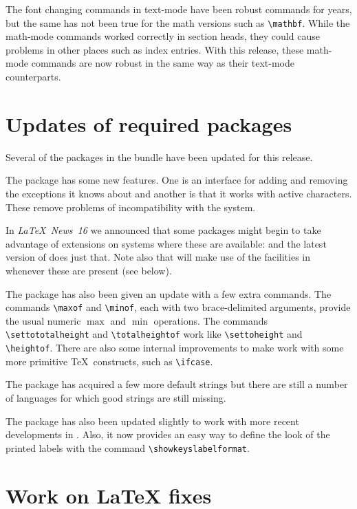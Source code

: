 \documentclass
    [lw35fonts]    %
     {ltnews}[2004/02/28]
\begin{document}
The font changing commands in text-mode have been robust commands for years,
but the same has not been true for the math versions such as
\verb|\mathbf|.  While the math-mode commands worked correctly in
section heads, they could cause problems in other places such as index
entries.  With this release, these math-mode commands are now robust in
the same way as their text-mode counterparts.

\pagebreak


\section{Updates of required packages}

Several of the packages in the  bundle have been updated
for this release.

The  package has some new features.  One is an
interface for adding and removing the exceptions it knows about and
another is that it works with active characters. These remove problems
of incompatibility with the  system.

In \textit{\LaTeX\ News~16} we announced that some packages might
begin to take advantage of \eTeX{} extensions on systems where these
are available: and the latest version of  does just
that.  Note also that  will make use of the
facilities in \eTeX{} whenever these are present (see below).

The  package has also been given an update with a few
extra commands.
The commands \verb|\maxof| and \verb|\minof|, each with two
brace-delimited arguments, provide the usual numeric $\max$ and $\min$
operations. The commands \verb|\settototalheight| and
\verb|\totalheightof| work like \verb|\settoheight| and
\verb|\heightof|.  There are also some internal improvements to make
 work with some more primitive \TeX\ constructs, such as
\verb|\ifcase|.

The  package has acquired a few more default
strings but there are still a number of languages for
which good strings are still missing.

The  package has also been updated slightly to work
with more recent developments in . Also, it now
provides an easy way to define the look of the printed labels with
the command \verb|\showkeyslabelformat|.

\section{Work on \LaTeX{} fixes}
\end{document}
